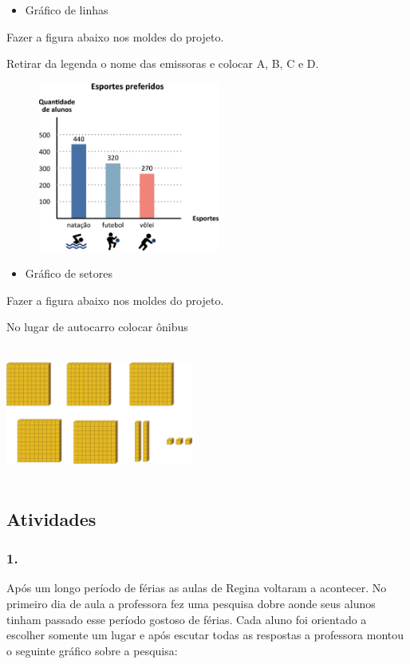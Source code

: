 \begin{itemize}
\item
  Gráfico de linhas
\end{itemize}

Fazer a figura abaixo nos moldes do projeto.

Retirar da legenda o nome das emissoras e colocar A, B, C e D.

\includegraphics[width=3.19872in,height=2.19483in]{media/image90.png}

\begin{itemize}
\item
  Gráfico de setores
\end{itemize}

Fazer a figura abaixo nos moldes do projeto.

No lugar de autocarro colocar ônibus

\includegraphics[width=2.42308in,height=1.74971in]{media/image91.png}

\subsection{Atividades}\label{atividades-7}

\subsubsection{1.}\label{section-108}

Após um longo período de férias as aulas de Regina voltaram a acontecer.
No primeiro dia de aula a professora fez uma pesquisa dobre aonde seus
alunos tinham passado esse período gostoso de férias. Cada aluno foi
orientado a escolher somente um lugar e após escutar todas as respostas
a professora montou o seguinte gráfico sobre a pesquisa:

